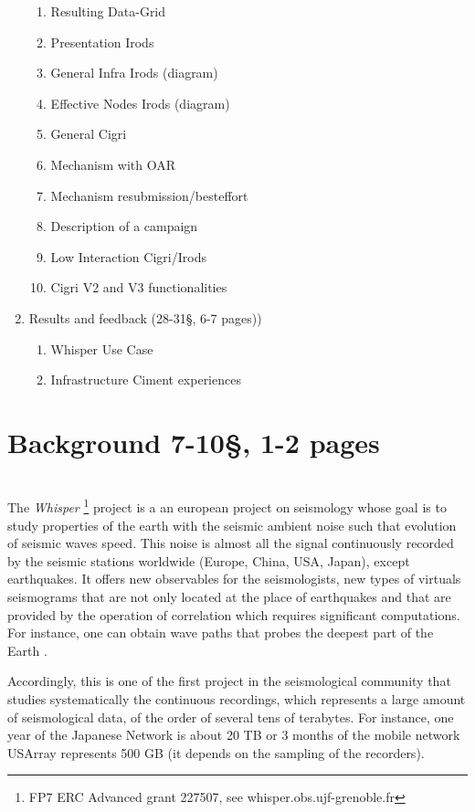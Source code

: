 \documentclass[a4paper, 10pt]{article}
\begin{document}
\begin{multicols}{2}
\begin{enumerate}
\begin{enumerate}
  	  \item Resulting Data-Grid
      \item Presentation Irods
	  \item General Infra Irods (diagram)
	  \item Effective Nodes Irods (diagram)
  	  \item General Cigri
  	  \item Mechanism with OAR
  	  \item Mechanism resubmission/besteffort
  	  \item Description of a campaign
  	  \item Low Interaction Cigri/Irods
  	  \item Cigri V2 and V3 functionalities
  	\end{enumerate}
  \item Results and feedback (28-31\S, 6-7 pages))
      \begin{enumerate}
	    \item Whisper Use Case
        \item Infrastructure Ciment experiences
       \end{enumerate}
\end{enumerate}

\newpage
\section{Background 7-10\S, 1-2 pages}
~\\




The \emph{Whisper} \footnote{FP7 ERC Advanced grant 227507, see whisper.obs.ujf-grenoble.fr} 
project is a an european project on seismology whose goal is to study properties of the earth
with the seismic ambient noise such that evolution of seismic waves speed. 
This noise is almost all the signal continuously recorded by
the seismic stations worldwide (Europe, China, USA, Japan), except earthquakes. It offers new
observables for the seismologists, new types of virtuals seismograms that are not only located at the 
place of earthquakes and that are provided by the operation of correlation  which requires significant computations.
For instance, one can obtain wave paths that probes the deepest part of the Earth \cite{key:BPCPBR, key:PCP}.

 
Accordingly, this is one of the first project in the seismological community that studies
systematically the continuous recordings, which represents a large amount of seismological data, 
of the order of several tens of terabytes.
For instance, one year of the Japanese Network is about 20 TB or 3 months of the mobile network
USArray represents 500 GB (it depends on the sampling of the recorders).



\end{multicols}
\end{document}
